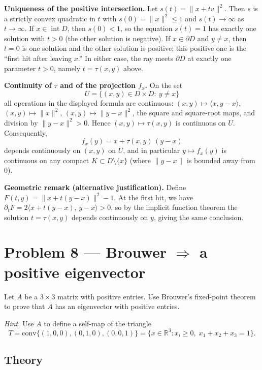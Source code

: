 \documentclass[12pt,a4paper]{article}
\theoremstyle{plain}
\theoremstyle{definition}
\theoremstyle{remark}
\theoremstyle{remark}
\begin{document}
\smallskip

\noindent\textbf{Uniqueness of the positive intersection.}
Let $s(t)=\|x+t v\|^2$. Then $s$ is a strictly convex quadratic in $t$ with
$s(0)=\|x\|^2\le 1$ and $s(t)\to\infty$ as $t\to\infty$.
If $x\in \operatorname{int} D$, then $s(0)<1$, so the equation $s(t)=1$ has exactly one solution with $t>0$
(the other solution is negative).
If $x\in \partial D$ and $y\ne x$, then $t=0$ is one solution and the other solution is positive;
this positive one is the “first hit after leaving $x$.” In either case, the ray meets $\partial D$
at exactly one parameter $t>0$, namely $t=\tau(x,y)$ above.

\smallskip

\noindent\textbf{Continuity of $\tau$ and of the projection $f_x$.}
On the set
\[
U=\{(x,y)\in D\times D:\ y\ne x\}
\]
all operations in the displayed formula are continuous:
$(x,y)\mapsto \langle x,y-x\rangle$, $(x,y)\mapsto \|x\|^2$, $(x,y)\mapsto \|y-x\|^2$,
the square and square-root maps, and division by $\|y-x\|^2>0$.
Hence $(x,y)\mapsto \tau(x,y)$ is continuous on $U$.
Consequently,
\[
f_x(y)=x+\tau(x,y)\,(y-x)
\]
depends continuously on $(x,y)$ on $U$, and in particular $y\mapsto f_x(y)$ is continuous
on any compact $K\subset D\setminus\{x\}$ (where $\|y-x\|$ is bounded away from $0$).

\smallskip

\noindent\textbf{Geometric remark (alternative justification).}
Define $F(t,y)=\|x+t(y-x)\|^2-1$.
At the first hit, we have $\partial_t F=2\langle x+t(y-x),\,y-x\rangle>0$, so by the implicit function theorem
the solution $t=\tau(x,y)$ depends continuously on $y$, giving the same conclusion.

\section*{Problem 8 — Brouwer $\Rightarrow$ a positive eigenvector}

Let $A$ be a $3\times3$ matrix with positive entries. Use Brouwer's fixed-point theorem
to prove that $A$ has an eigenvector with positive entries.

\smallskip

\noindent\emph{Hint.} Use $A$ to define a self-map of the triangle
\[
T=\mathrm{conv}\{(1,0,0),(0,1,0),(0,0,1)\}
=\{x\in\mathbb{R}^3: x_i\ge 0,\; x_1+x_2+x_3=1\}.
\]

\bigskip

\subsection*{Theory}
\end{document}
